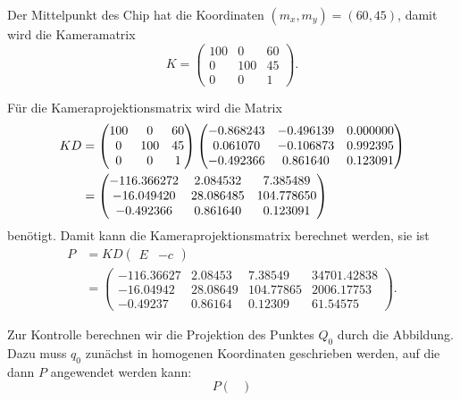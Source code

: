 \begin{loesung}
\begin{teilaufgaben}
\item Der Mittelpunkt des Chip hat die Koordinaten $(m_x,m_y)=(60,45)$,
damit wird die Kameramatrix
\[
K
=
\begin{pmatrix}
100&  0&60\\
  0&100&45\\
  0&  0& 1
\end{pmatrix}.
\]
\item Für die Kameraprojektionsmatrix wird die Matrix
\begin{align}
KD
&=
\begin{pmatrix}
100&  0&60\\
  0&100&45\\
  0&  0& 1
\end{pmatrix}
\begin{pmatrix}
  -0.868243& -0.496139&  0.000000\\
   0.061070& -0.106873&  0.992395\\
  -0.492366&  0.861640&  0.123091
\end{pmatrix}
\notag
\\
&=
\begin{pmatrix}
  -116.366272&     2.084532&     7.385489\\
   -16.049420&    28.086485&   104.778650\\
    -0.492366&     0.861640&     0.123091
\end{pmatrix}
\label{60000001:kd}
\end{align}
benötigt.
Damit kann die Kameraprojektionsmatrix berechnet werden, sie ist
\begin{align*}
P
&=
KD\begin{pmatrix}E&-c\end{pmatrix}
\\
&=
\begin{pmatrix}
  -116.36627&  2.08453&   7.38549& 34701.42838\\
   -16.04942& 28.08649& 104.77865&  2006.17753\\
    -0.49237&  0.86164&   0.12309&    61.54575
\end{pmatrix}.
\end{align*}
\item
Zur Kontrolle berechnen wir die Projektion des Punktes $Q_0$ durch die
Abbildung. 
Dazu muss $q_0$ zunächst in homogenen Koordinaten geschrieben werden,
auf die dann $P$ angewendet werden kann:
\[
P
\begin{pmatrix}

\end{pmatrix}\]
\end{teilaufgaben}
\end{loesung}
